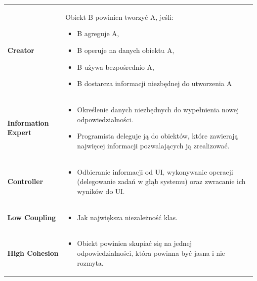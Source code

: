 \documentclass[a4paper]{article}
\begin{document}
    \begin{table}[H]
        \begin{center}
            \begin{tabular}{  p{3cm} p{12cm}  }
                \textbf{Creator}
                &
                Obiekt B powinien tworzyć A, jeśli:
                \begin{itemize}
                    \item B agreguje A,
                    \item B operuje na danych obiektu A,
                    \item B używa bezpośrednio A,
                    \item B dostarcza informacji niezbędnej do utworzenia A
                \end{itemize}
                \\

                \textbf{Information Expert}
                &
                \begin{itemize}
                    \item Określenie danych niezbędnych do wypełnienia nowej odpowiedzialności.
                    \item Programista deleguje ją do obiektów, które
                    zawierają najwięcej informacji pozwalających ją zrealizować.
                \end{itemize}
                \\

                \textbf{Controller}
                &
                \begin{itemize}
                    \item Odbieranie informacji od UI, wykonywanie operacji (delegowanie zadań w głąb systemu) oraz zwracanie ich wyników do UI.
                \end{itemize}
                \\

                \textbf{Low Coupling}
                &
                \begin{itemize}
                    \item Jak największa niezależność klas.
                \end{itemize}
                \\

                \textbf{High Cohesion}
                &
                \begin{itemize}
                    \item Obiekt powinien skupiać się na jednej odpowiedzialności, która powinna być jasna i nie rozmyta.
                \end{itemize}
                \\


\end{tabular}
\end{center}
\end{table}
\end{document}
